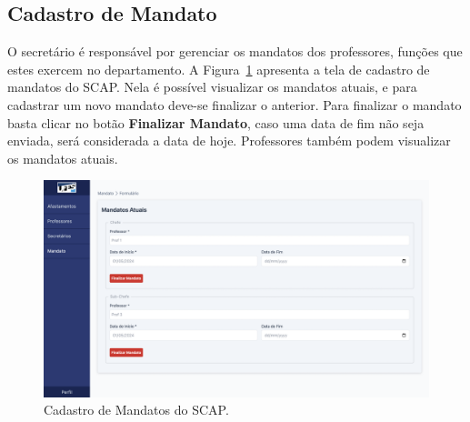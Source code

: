 \subsection{Cadastro de Mandato}
\label{subsec-projeto-cadastro-mandato}

O secretário é responsável por gerenciar os mandatos dos professores, funções que estes exercem
no departamento. A Figura~\ref{fig-mandato} apresenta a tela de cadastro de mandatos do SCAP.
Nela é possível visualizar os mandatos atuais, e para cadastrar um novo mandato deve-se finalizar o anterior.
Para finalizar o mandato basta clicar no botão \textbf{Finalizar Mandato}, caso uma data de fim não seja enviada,
será considerada a data de hoje. Professores também podem visualizar os mandatos atuais. 

\begin{figure}[h!]
    \centering
    \includegraphics[width=\textwidth]{figuras/prints-app/fig-mandato-visao-secretario.png}
    \caption{Cadastro de Mandatos do SCAP.}
    \label{fig-mandato}
\end{figure}

